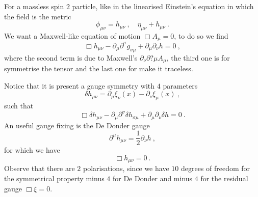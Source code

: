     For a massless spin $2$ particle, like in the linearised Einstein's equation in which the field is the metric 
    \begin{equation*}
        \phi_{\mu\nu} = h_{\mu\nu}~, \quad \eta_{\mu\nu} + h_{\mu\nu} ~.
    \end{equation*}
    We want a Maxwell-like equation of motion $\Box A_\mu = 0$, to do so we find 
    \begin{equation*}
        \Box h_{\mu\nu} - \partial_\mu \partial^\sigma g_{\sigma \mu} + \partial_\mu \partial_\nu h = 0 ~,
    \end{equation*}
    where the second term is due to Maxwell's $\partial_\nu \partial?\mu A_\mu$, the third one is for symmetrise the tensor and the last one for make it traceless. 

    Notice that it is present a gauge symmetry with $4$ parameters 
    \begin{equation*}
        \delta h_{\mu\nu} = \partial_\mu \xi_\nu (x) - \partial_\nu \xi_\mu (x) ~,
    \end{equation*}
    such that 
    \begin{equation*}
        \Box \delta h_{\mu\nu} - \partial_\mu \partial^\sigma \delta h_{\sigma \mu} + \partial_\mu \partial_\nu \delta h = 0 ~.
    \end{equation*}
    An useful gauge fixing is the De Donder gauge 
    \begin{equation*}
        \partial^\mu h_{\mu\nu} = \frac{1}{2} \partial_\nu h ~,
    \end{equation*}
    for which we have 
    \begin{equation*}
        \Box h_{\mu\nu} = 0 ~.
    \end{equation*}
    Observe that there are $2$ polarisations, since we have $10$ degrees of freedom for the symmetrical property minus $4$ for De Donder and minus $4$ for the residual gauge $\Box \xi = 0$.